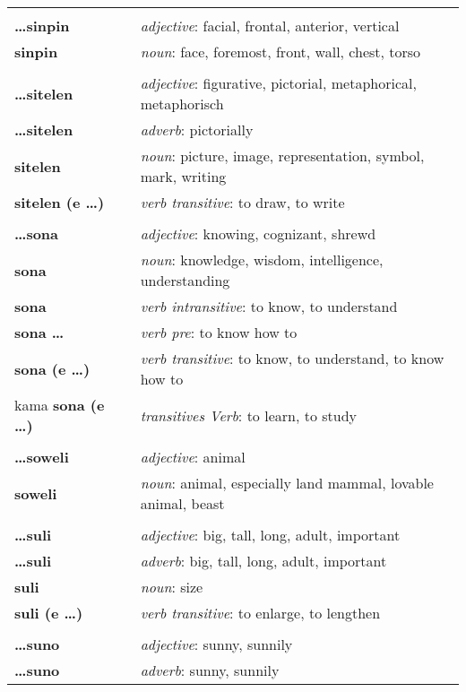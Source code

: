 \begin{supertabular}{p{2,5cm}|ll}
 && \\ %
\textbf{\dots sinpin} && \textit{adjective}: facial, frontal, anterior, vertical \\ 
\textbf{sinpin} && \textit{noun}: face, foremost, front, wall, chest, torso \\ 
 && \\ %
\textbf{\dots sitelen} && \textit{adjective}: figurative, pictorial, metaphorical, metaphorisch \\ 
\textbf{\dots sitelen} && \textit{adverb}: pictorially \\ 
\textbf{sitelen} && \textit{noun}: picture, image, representation, symbol, mark, writing \\ 
\textbf{sitelen (e \dots)} && \textit{verb transitive}: to draw, to write \\ 
 && \\ %
\textbf{\dots sona} && \textit{adjective}: knowing, cognizant, shrewd \\ 
\textbf{sona} && \textit{noun}: knowledge, wisdom, intelligence, understanding \\ 
\textbf{sona} && \textit{verb intransitive}: to know, to understand \\ 
\textbf{sona \dots} && \textit{verb pre}: to know how to \\ 
\textbf{sona (e \dots)} && \textit{verb transitive}: to know, to understand, to know how to \\ 
kama \textbf{sona (e \dots)} && \textit{transitives Verb}: to learn, to study \\ 
 && \\ %
\textbf{\dots soweli} && \textit{adjective}: animal \\ 
\textbf{soweli} && \textit{noun}: animal, especially land mammal, lovable animal, beast \\ 
 && \\ %
\textbf{\dots suli} && \textit{adjective}: big, tall, long, adult, important \\ 
\textbf{\dots suli} && \textit{adverb}: big, tall, long, adult, important \\ 
\textbf{suli} && \textit{noun}: size \\ 
\textbf{suli (e \dots)} && \textit{verb transitive}: to enlarge, to lengthen \\ 
 && \\ %
\textbf{\dots suno} && \textit{adjective}: sunny, sunnily \\ 
\textbf{\dots suno} && \textit{adverb}: sunny, sunnily \\ 

\end{supertabular}

